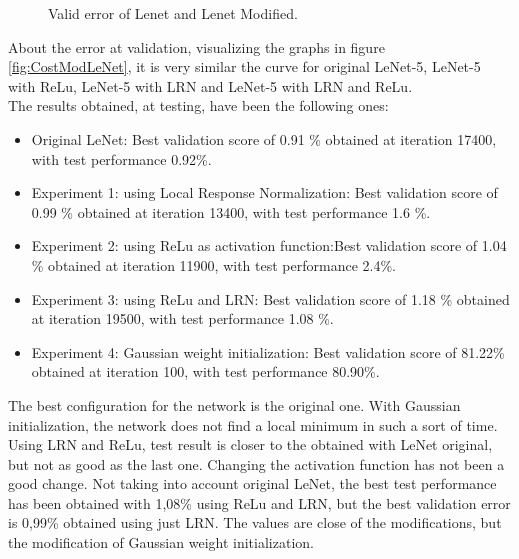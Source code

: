 \begin{figure}[htb]
    \caption{Valid error of Lenet and Lenet Modified.} \label{fig:ErrorModLeNet}
\end{figure}

About the error at validation, visualizing the graphs in figure \ref{fig:CostModLeNet}, it is very similar the curve for original LeNet-5, LeNet-5 with ReLu, LeNet-5 with LRN and LeNet-5 with LRN and ReLu.\\

The results obtained, at testing, have been the following ones:

\begin{itemize}
\item{Original LeNet}: Best validation score of 0.91 \% obtained at iteration 17400, with test performance 0.92\%.
\item{Experiment 1: using Local Response Normalization}: Best validation score of 0.99 \% obtained at iteration 13400, with test performance 1.6 \%.
\item{Experiment 2: using ReLu as activation function}:Best validation score of 1.04 \% obtained at iteration 11900, with test performance 2.4\%.
\item{Experiment 3: using ReLu and LRN}: Best validation score of 1.18 \% obtained at iteration 19500, with test performance 1.08 \%.
\item{Experiment 4: Gaussian weight initialization}: Best validation score of 81.22\% obtained at iteration 100, with test performance 80.90\%.
\end{itemize}

The best configuration for the network is the original one. With Gaussian initialization, the network does not find a local minimum in such a sort of time. Using LRN and ReLu, test result is closer to the obtained with LeNet original, but not as good as the last one. Changing the activation function has not been a good change. Not taking into account original LeNet, the best test performance has been obtained with 1,08\% using ReLu and LRN, but the best validation error is 0,99\% obtained using just LRN. The values are close of the modifications, but the modification of Gaussian weight initialization.\\

